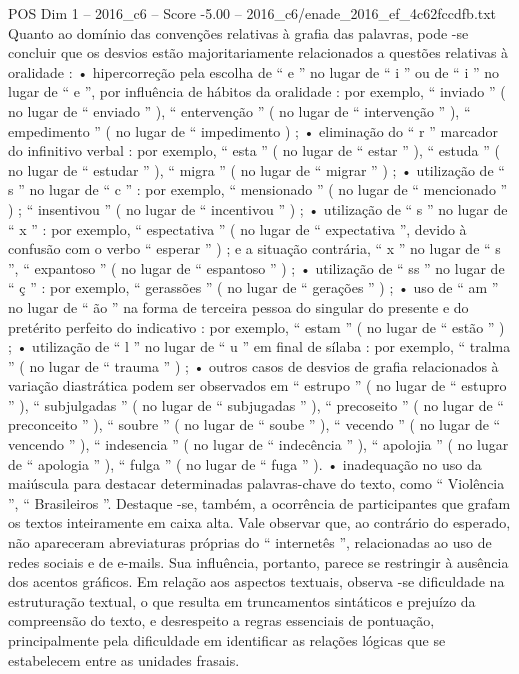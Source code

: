 \begin{textsample}{POS Dim 1 – 2016\_c6 – Score -5.00 – 2016\_c6/enade\_2016\_ef\_4c62fccdfb.txt}
Quanto ao domínio das convenções relativas à grafia das palavras, pode -se concluir que os desvios estão majoritariamente relacionados a questões relativas à oralidade : • hipercorreção pela escolha de “ e ” no lugar de “ i ” ou de “ i ” no lugar de “ e ”, por influência de hábitos da oralidade : por exemplo, “ inviado ” ( no lugar de “ enviado ” ), “ entervenção ” ( no lugar de “ intervenção ” ), “ empedimento ” ( no lugar de “ impedimento ) ; • eliminação do “ r ” marcador do infinitivo verbal : por exemplo, “ esta ” ( no lugar de “ estar ” ), “ estuda ” ( no lugar de “ estudar ” ), “ migra ” ( no lugar de “ migrar ” ) ; • utilização de “ s ” no lugar de “ c ” : por exemplo, “ mensionado ” ( no lugar de “ mencionado ” ) ; “ insentivou ” ( no lugar de “ incentivou ” ) ; • utilização de “ s ” no lugar de “ x ” : por exemplo, “ espectativa ” ( no lugar de “ expectativa ”, devido à confusão com o verbo “ esperar ” ) ; e a situação contrária, “ x ” no lugar de “ s ”, “ expantoso ” ( no lugar de “ espantoso ” ) ; • utilização de “ ss ” no lugar de “ ç ” : por exemplo, “ gerassões ” ( no lugar de “ gerações ” ) ; • uso de “ am ” no lugar de “ ão ” na forma de terceira pessoa do singular do presente e do pretérito perfeito do indicativo : por exemplo, “ estam ” ( no lugar de “ estão ” ) ; • utilização de “ l ” no lugar de “ u ” em final de sílaba : por exemplo, “ tralma ” ( no lugar de “ trauma ” ) ; • outros casos de desvios de grafia relacionados à variação diastrática podem ser observados em “ estrupo ” ( no lugar de “ estupro ” ), “ subjulgadas ” ( no lugar de “ subjugadas ” ), “ precoseito ” ( no lugar de “ preconceito ” ), “ soubre ” ( no lugar de “ soube ” ), “ vecendo ” ( no lugar de “ vencendo ” ), “ indesencia ” ( no lugar de “ indecência ” ), “ apolojia ” ( no lugar de “ apologia ” ), “ fulga ” ( no lugar de “ fuga ” ). • inadequação no uso da maiúscula para destacar determinadas palavras-chave do texto, como “ Violência ”, “ Brasileiros ”.
Destaque -se, também, a ocorrência de participantes que grafam os textos inteiramente em caixa alta.
Vale observar que, ao contrário do esperado, não apareceram abreviaturas próprias do “ internetês ”, relacionadas ao uso de redes sociais e de e-mails.
Sua influência, portanto, parece se restringir à ausência dos acentos gráficos.
Em relação aos aspectos textuais, observa -se dificuldade na estruturação textual, o que resulta em truncamentos sintáticos e prejuízo da compreensão do texto, e desrespeito a regras essenciais de pontuação, principalmente pela dificuldade em identificar as relações lógicas que se estabelecem entre as unidades frasais.

\end{textsample}
